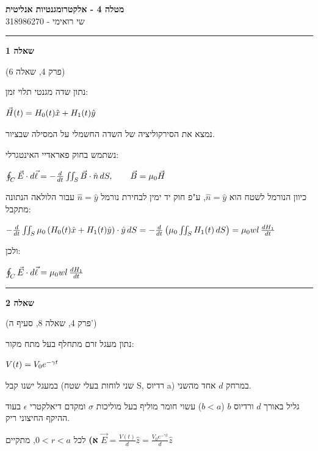 \documentclass[14pt]{extarticle}
\makeatletter
\newenvironment{lefteqs}{%
    \begin{english}%
    \begin{flushleft}%
    \renewcommand{\arraystretch}{1.3}%
    $\begin{array}{@{}l@{}}%
}{%
    \end{array}$%
    \end{flushleft}%
    \end{english}%
}
\makeatother
\begin{document}
\begin{center}
    {\LARGE \textbf{מטלה 4 - אלקטרומגנטיות אנליטית}}\\[0.5em]
    {\large שי רואימי - 318986270}\\[0.3em]
\end{center}

\hrule
\vspace{2em}

\textbf{\large שאלה 1}

(פרק 4, שאלה 6)

נתון שדה מגנטי תלוי זמן:
\begin{lefteqs}
    \vec{H}(t) = H_0(t)\hat{x} + H_1(t)\hat{y}
\end{lefteqs}

נמצא את הסירקוליציה של השדה החשמלי על המסילה שבציור.

נשתמש בחוק פאראדיי האינטגרלי:
\begin{lefteqs}
    \oint_C \vec{E}\cdot d\vec{\ell} = -\frac{d}{dt}\iint_S \vec{B}\cdot \hat{n}\,dS, \qquad \vec{B}=\mu_0\vec{H}
\end{lefteqs}

כיוון הנורמל לשטח הוא $\hat{n}=\hat{y}$, ע"פ חוק יד ימין
לבחירת נורמל $\hat{n}=\hat{y}$ עבור הלולאה הנתונה מתקבל:
\begin{lefteqs}
    -\frac{d}{dt}\iint_S \mu_0\left(H_0(t)\hat{x}+H_1(t)\hat{y}\right)\cdot\hat{y}\,dS
    = -\frac{d}{dt}\left(\mu_0\iint_S H_1(t)\,dS\right)
    = \mu_0wl\,\frac{dH_1}{dt}
\end{lefteqs}

ולכן:
\begin{lefteqs}
\oint_C \vec{E}\cdot d\vec{\ell} = \mu_0wl\,\frac{dH_1}{dt}
\end{lefteqs}

\vspace{3em}
\hrule
\vspace{2em}

\textbf{\large שאלה 2}

(פרק 4, שאלה 8, סעיף ה')

נתון מעגל זרם מתחלף בעל מתח מקור:
\begin{lefteqs}
V(t)=V_0e^{-\gamma t}
\end{lefteqs}

במעגל ישנו קבל (שני לוחות בעלי שטח S, רדיוס a) במרחק $d$ אחד מהשני.

גליל באורך $d$ ורדיוס $b$ ($b<a$) עשוי חומר מוליף בעל מוליכות $\sigma$ ומקדם דיאלקטרי $\epsilon$ בעוד ההיקף החיצוני ריק.

\textbf{א)} 
לכל $0<r<a$, מתקיים $\vec{E}=\frac{V(t)}{d}\hat{z}=\frac{V_0e^{-\gamma t}}{d}\hat{z}$
\end{document}
